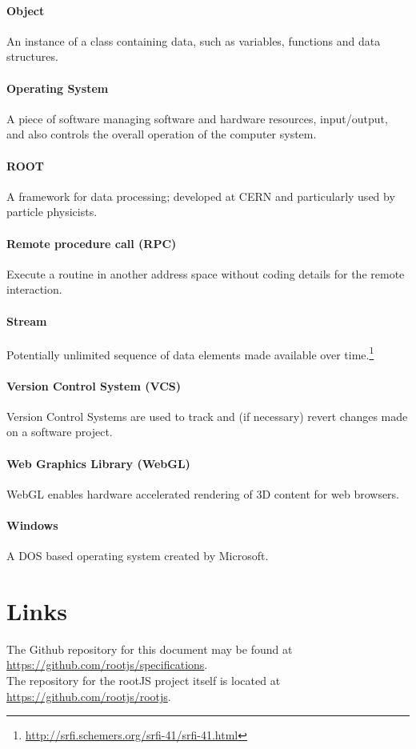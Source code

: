 \paragraph{Object}
An instance of a class containing data, such as variables, functions and data structures.

\paragraph{Operating System}
A piece of software managing software and hardware resources, input/output, and also controls the overall operation of the computer system.

\paragraph{ROOT}
A framework for data processing; developed at CERN and particularly used by particle physicists.

\paragraph{Remote procedure call (RPC)}
Execute a routine in another address space without coding details for the remote interaction.

\paragraph{Stream}
Potentially unlimited sequence of data elements made available over time.\footnote{\url{http://srfi.schemers.org/srfi-41/srfi-41.html}}

\paragraph{Version Control System (VCS)}
Version Control Systems are used to track and (if necessary) revert changes made on a software project.

\paragraph{Web Graphics Library (WebGL)}
WebGL enables hardware accelerated rendering of 3D content for web browsers.

\paragraph{Windows}
A DOS based operating system created by Microsoft.

\pagebreak[4]

\section{Links}

The Github repository for this document may be found at \url{https://github.com/rootjs/specifications}. \\
The repository for the rootJS project itself is located at \url{https://github.com/rootjs/rootjs}.
